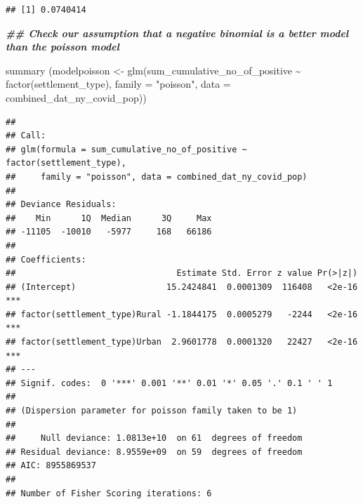 \documentclass[
  12pt,
]{article}
\newenvironment{Shaded}{\begin{snugshade}}{\end{snugshade}}
\newcommand{\AttributeTok}[1]{\textcolor[rgb]{0.77,0.63,0.00}{#1}}
\newcommand{\CommentTok}[1]{\textcolor[rgb]{0.56,0.35,0.01}{\textit{#1}}}
\newcommand{\ConstantTok}[1]{\textcolor[rgb]{0.00,0.00,0.00}{#1}}
\newcommand{\DocumentationTok}[1]{\textcolor[rgb]{0.56,0.35,0.01}{\textbf{\textit{#1}}}}
\newcommand{\FunctionTok}[1]{\textcolor[rgb]{0.00,0.00,0.00}{#1}}
\newcommand{\NormalTok}[1]{#1}
\newcommand{\OtherTok}[1]{\textcolor[rgb]{0.56,0.35,0.01}{#1}}
\newcommand{\SpecialCharTok}[1]{\textcolor[rgb]{0.00,0.00,0.00}{#1}}
\newcommand{\StringTok}[1]{\textcolor[rgb]{0.31,0.60,0.02}{#1}}
\begin{document}
\begin{Shaded}
\end{Shaded}

\begin{verbatim}
## [1] 0.0740414
\end{verbatim}

\begin{Shaded}
\begin{Highlighting}[]
\DocumentationTok{\#\# Check our assumption that a negative binomial is a better model than the poisson model}

\FunctionTok{summary}\NormalTok{ (modelpoisson }\OtherTok{\textless{}{-}} \FunctionTok{glm}\NormalTok{(sum\_cumulative\_no\_of\_positive }\SpecialCharTok{\textasciitilde{}} \FunctionTok{factor}\NormalTok{(settlement\_type), }\AttributeTok{family =} \StringTok{"poisson"}\NormalTok{, }\AttributeTok{data =}\NormalTok{ combined\_dat\_ny\_covid\_pop))}
\end{Highlighting}
\end{Shaded}

\begin{verbatim}
## 
## Call:
## glm(formula = sum_cumulative_no_of_positive ~ factor(settlement_type), 
##     family = "poisson", data = combined_dat_ny_covid_pop)
## 
## Deviance Residuals: 
##    Min      1Q  Median      3Q     Max  
## -11105  -10010   -5977     168   66186  
## 
## Coefficients:
##                                Estimate Std. Error z value Pr(>|z|)    
## (Intercept)                  15.2424841  0.0001309  116408   <2e-16 ***
## factor(settlement_type)Rural -1.1844175  0.0005279   -2244   <2e-16 ***
## factor(settlement_type)Urban  2.9601778  0.0001320   22427   <2e-16 ***
## ---
## Signif. codes:  0 '***' 0.001 '**' 0.01 '*' 0.05 '.' 0.1 ' ' 1
## 
## (Dispersion parameter for poisson family taken to be 1)
## 
##     Null deviance: 1.0813e+10  on 61  degrees of freedom
## Residual deviance: 8.9559e+09  on 59  degrees of freedom
## AIC: 8955869537
## 
## Number of Fisher Scoring iterations: 6
\end{verbatim}
\end{document}
